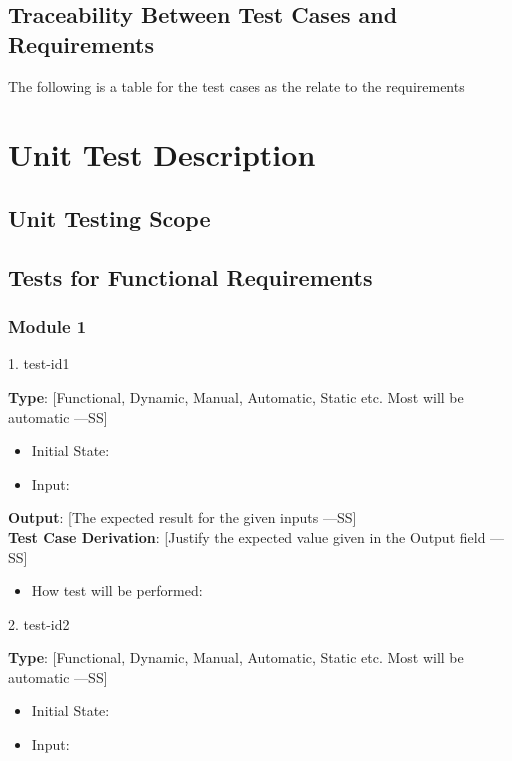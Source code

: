 \documentclass[12pt, titlepage]{article}
\begin{document}
\subsection{Traceability Between Test Cases and Requirements}

The following is a table for the test cases as the relate to the requirements

\section{Unit Test Description}

\subsection{Unit Testing Scope}

\subsection{Tests for Functional Requirements}

\subsubsection{Module 1}

1. test-id1

\textbf{Type}: [Functional, Dynamic, Manual, Automatic, Static etc. Most will be automatic —SS]\\
\begin{itemize}
  \item Initial State:
  \item Input:
\end{itemize}

\textbf{Output}: [The expected result for the given inputs —SS]\\
\textbf{Test Case Derivation}: [Justify the expected value given in the Output field —SS]\\
\begin{itemize}
  \item How test will be performed:
\end{itemize}

2. test-id2

\textbf{Type}: [Functional, Dynamic, Manual, Automatic, Static etc. Most will be automatic —SS]\\
\begin{itemize}
  \item Initial State:
  \item Input:
\end{itemize}
\end{document}
